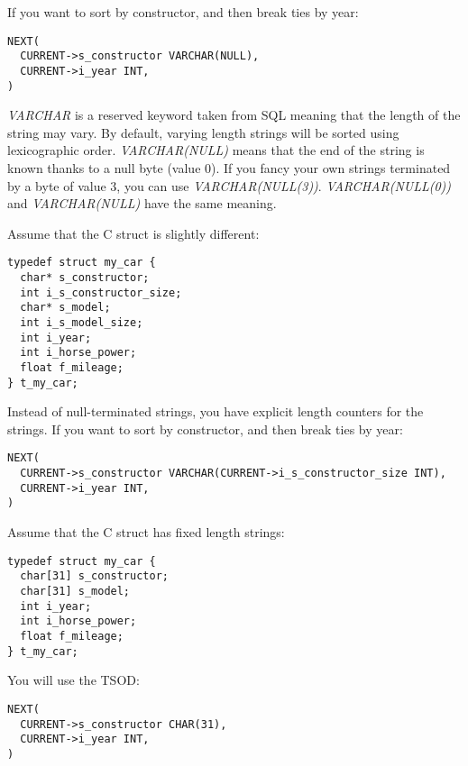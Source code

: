 \documentclass[a4paper,11pt]{report}
\begin{document}
If you want to sort by constructor, and then break ties by year:
\begin{verbatim}
NEXT(
  CURRENT->s_constructor VARCHAR(NULL),
  CURRENT->i_year INT,
)
\end{verbatim}
\emph{VARCHAR} is a reserved keyword taken from SQL meaning that the length of the string may vary.
By default, varying length strings will be sorted using lexicographic order.
\emph{VARCHAR(NULL)} means that the end of the string is known thanks to a null byte (value 0).
If you fancy your own strings terminated by a byte of value 3, you can use \emph{VARCHAR(NULL(3))}.
\emph{VARCHAR(NULL(0))} and \emph{VARCHAR(NULL)} have the same meaning.

Assume that the C struct is slightly different:
\begin{verbatim}
typedef struct my_car {
  char* s_constructor;
  int i_s_constructor_size;
  char* s_model;
  int i_s_model_size;
  int i_year;
  int i_horse_power;
  float f_mileage;
} t_my_car;
\end{verbatim}
Instead of null-terminated strings, you have explicit length counters for the strings.
If you want to sort by constructor, and then break ties by year:
\begin{verbatim}
NEXT(
  CURRENT->s_constructor VARCHAR(CURRENT->i_s_constructor_size INT),
  CURRENT->i_year INT,
)
\end{verbatim}

Assume that the C struct has fixed length strings:
\begin{verbatim}
typedef struct my_car {
  char[31] s_constructor;
  char[31] s_model;
  int i_year;
  int i_horse_power;
  float f_mileage;
} t_my_car;
\end{verbatim}
You will use the TSOD:
\begin{verbatim}
NEXT(
  CURRENT->s_constructor CHAR(31),
  CURRENT->i_year INT,
)
\end{verbatim}
\end{document}
